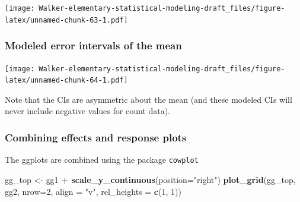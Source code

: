 \documentclass[]{book}
\newenvironment{Shaded}{\begin{snugshade}}{\end{snugshade}}
\newcommand{\KeywordTok}[1]{\textcolor[rgb]{0.13,0.29,0.53}{\textbf{#1}}}
\newcommand{\DataTypeTok}[1]{\textcolor[rgb]{0.13,0.29,0.53}{#1}}
\newcommand{\DecValTok}[1]{\textcolor[rgb]{0.00,0.00,0.81}{#1}}
\newcommand{\FloatTok}[1]{\textcolor[rgb]{0.00,0.00,0.81}{#1}}
\newcommand{\StringTok}[1]{\textcolor[rgb]{0.31,0.60,0.02}{#1}}
\newcommand{\CommentTok}[1]{\textcolor[rgb]{0.56,0.35,0.01}{\textit{#1}}}
\newcommand{\OtherTok}[1]{\textcolor[rgb]{0.56,0.35,0.01}{#1}}
\newcommand{\OperatorTok}[1]{\textcolor[rgb]{0.81,0.36,0.00}{\textbf{#1}}}
\newcommand{\NormalTok}[1]{#1}
\begin{document}
\texttt{[image: Walker-elementary-statistical-modeling-draft\_files/figure-latex/unnamed-chunk-63-1.pdf]}

\subsubsection{Modeled error intervals of the
mean}\label{modeled-error-intervals-of-the-mean}

\begin{Shaded}
\end{Shaded}

\texttt{[image: Walker-elementary-statistical-modeling-draft\_files/figure-latex/unnamed-chunk-64-1.pdf]}

Note that the CIs are asymmetric about the mean (and these modeled CIs
will never include negative values for count data).

\subsubsection{Combining effects and response
plots}\label{combining-effects-and-response-plots}

The ggplots are combined using the package \texttt{cowplot}

\begin{Shaded}
\begin{Highlighting}[]
\NormalTok{gg_top <-}\StringTok{ }\NormalTok{gg1 }\OperatorTok{+}\StringTok{ }\KeywordTok{scale_y_continuous}\NormalTok{(}\DataTypeTok{position=}\StringTok{"right"}\NormalTok{)}
\KeywordTok{plot_grid}\NormalTok{(gg_top, gg2, }\DataTypeTok{nrow=}\DecValTok{2}\NormalTok{, }\DataTypeTok{align =} \StringTok{"v"}\NormalTok{, }\DataTypeTok{rel_heights =} \KeywordTok{c}\NormalTok{(}\DecValTok{1}\NormalTok{, }\DecValTok{1}\NormalTok{))}
\end{Highlighting}
\end{Shaded}
\end{document}
